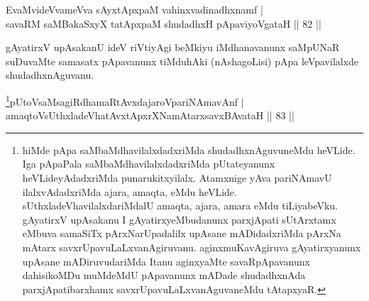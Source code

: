 \begin{shl}
EvaMvideVvameVva sAyxtApxpaM vahinxvadinadhxnamf | \\
savaRM saMBakaSxyX tatApxpaM shudadhxH pApaviyoVgataH \hfill||  82 ||
\end{shl}

\begin{artha} 
gAyatirxV upAsakanU ideV riVtiyAgi beMkiyu iMdhanavanunx saMpUNaR 
suDuvaMte samasatx pApavanunx tiMduhAki (nAshagoLisi) pApa 
leVpavilalxde shudadhxnAguvanu.
\end{artha}



\begin{shl}
\footnote{hiMde pApa saMbaMdhavilalxdadxriMda shudadhxnAguvuneMdu heVLide. Iga pApaPala saMbaMdhavilalxdadxriMda pUtateyanunx heVLideyAdadxriMda punarukitxyilalx. Atamxnige yAva pariNAmavU ilalxvAdadxriMda ajara, amaqta, eMdu heVLide. sUthxladeVhavilalxdariMdalU amaqta, ajara, amara eMdu tiLiyabeVku. gAyatirxV upAsakanu I gAyatirxyeMbudanunx parxjApati sUtArxtamx eMbuva samaSiTx pArxNarUpadalilx upAsane mADidadxriMda pArxNa mAtarx savxrUpavuLaLxvanAgiruvanu. aginxmuKavAgiruva gAyatirxyanunx upAsane mADiruvudariMda Itanu aginxyaMte savaRpApavanunx dahisikoMDu muMdeMdU pApavanunx mADade shudadhxnAda parxjApatibarxhamx savxrUpavuLaLxvanAguvaneMdu tAtapxyaR.}pUtoV\s saMsagiRdhamaRtAvxdajaroV\s pariNAmavAnf | \\
amaqtoV\s sUthxladeVhatAvxtApxrXNamAtarxsavxBAvataH \hfill||  83 ||
\end{shl}

